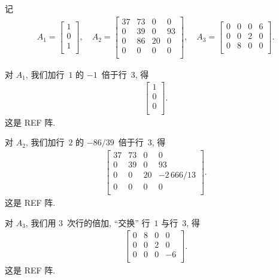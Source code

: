 \documentclass[../libro.tex]{subfiles}
\begin{document}
\begin{example}
    记
    \begin{align*}
        A_1 =
        \begin{bmatrix}
            1 \\
            0 \\
            1 \\
        \end{bmatrix},
        \quad
        A_2 =
        \begin{bmatrix}
            37 & 73 & 0  & 0  \\
            0  & 39 & 0  & 93 \\
            0  & 86 & 20 & 0  \\
            0  & 0  & 0  & 0  \\
        \end{bmatrix},
        \quad
        A_3 =
        \begin{bmatrix}
            0 & 0 & 0 & 6 \\
            0 & 0 & 2 & 0 \\
            0 & 8 & 0 & 0 \\
        \end{bmatrix}.
    \end{align*}

    对 \(A_1\),
    我们加行~\(1\) 的 \(-1\)~倍于行~\(3\), 得
    \begin{align*}
        \begin{bmatrix}
            1 \\
            0 \\
            0 \\
        \end{bmatrix}.
    \end{align*}
    这是 REF 阵.

    对 \(A_2\),
    我们加行~\(2\) 的 \(-86/39\)~倍于行~\(3\), 得
    \begin{align*}
        \begin{bmatrix}
            37 & 73 & 0  & 0          \\
            0  & 39 & 0  & 93         \\
            0  & 0  & 20 & -2\,666/13 \\
            0  & 0  & 0  & 0          \\
        \end{bmatrix}.
    \end{align*}
    这是 REF 阵.

    对 \(A_3\),
    我们用 \(3\)~次行的倍加,
    ``交换'' 行~\(1\) 与行~\(3\), 得
    \begin{align*}
        \begin{bmatrix}
            0 & 8 & 0 & 0  \\
            0 & 0 & 2 & 0  \\
            0 & 0 & 0 & -6 \\
        \end{bmatrix}.
    \end{align*}
    这是 REF 阵.
\end{example}
\end{document}
